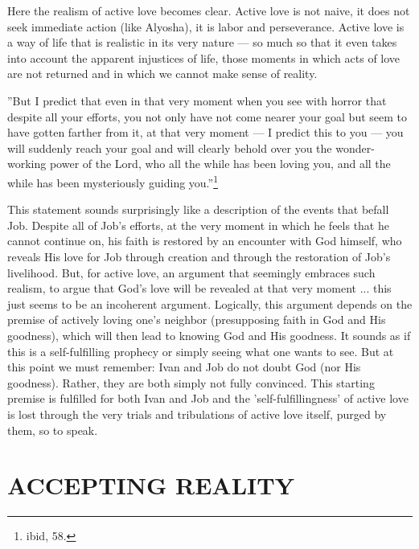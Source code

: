 Here the realism of active love becomes clear. Active love is not naive, it does not seek immediate action (like Alyosha), it is labor and perseverance. Active love is a way of life that is realistic in its very nature --- so much so that it even takes into account the apparent injustices of life, those moments in which acts of love are not returned and in which we cannot make sense of reality. 

''But I predict that even in that very moment when you see with horror that despite all your efforts, you not only have not come nearer your goal but seem to have gotten farther from it, at that very moment --- I predict this to you --- you will suddenly reach your goal and will clearly behold over you the wonder-working power of the Lord, who all the while has been loving you, and all the while has been mysteriously guiding you.''\footnote{ibid, 58.}

This statement sounds surprisingly like a description of the events that befall Job. Despite all of Job's efforts, at the very moment in which he feels that he cannot continue on, his faith is restored by an encounter with God himself, who reveals His love for Job through creation and through the restoration of Job's livelihood. But, for active love, an argument that seemingly embraces such realism, to argue that God's love will be revealed at that very moment ... this just seems to be an incoherent argument. Logically, this argument depends on the premise of actively loving one's neighbor (presupposing faith in God and His goodness), which will then lead to knowing God and His goodness. It sounds as if this is a self-fulfilling prophecy or simply seeing what one wants to see. But at this point we must remember: Ivan and Job do not doubt God (nor His goodness). Rather, they are both simply not fully convinced. This starting premise is fulfilled for both Ivan and Job and the 'self-fulfillingness' of active love is lost through the very trials and tribulations of active love itself, purged by them, so to speak.

\chapter{ACCEPTING REALITY}

